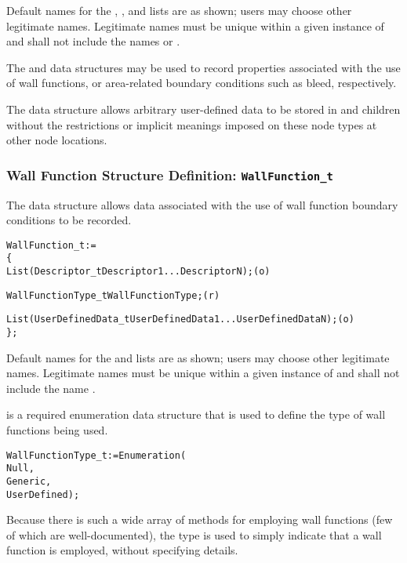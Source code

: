 \begin{notes}
\item
 Default names for the , , and
 lists are as shown; users may choose other legitimate names.
 Legitimate names must be unique within a given instance of
  and shall not include the names  or
 .
\end{notes}

The  and  data structures may be
used to record properties associated with the use of wall functions, or
area-related boundary conditions such as bleed, respectively.

The  data structure allows arbitrary
user-defined data to be stored in  and
 children without the restrictions or implicit
meanings imposed on these node types at other node locations.

\subsubsection{Wall Function Structure Definition: \texttt{WallFunction\_t}}
\label{s:WallFunction}

The  data structure allows data associated with
the use of wall function boundary conditions to be recorded.

\begin{alltt}
  WallFunction\_t :=
    \{
    List( Descriptor\_t  Descriptor1 ... DescriptorN ) ;                     (o)

    WallFunctionType\_t WallFunctionType ;                                   (r)

    List( UserDefinedData\_t UserDefinedData1 ... UserDefinedDataN ) ;       (o)
    \} ;
\end{alltt}

\begin{notes}
\item
 Default names for the  and 
 lists are as shown; users may choose other legitimate names.
 Legitimate names must be unique within a given instance of
  and shall not include the name
 .
\end{notes}

 is a required enumeration data structure
that is used to define the type of wall functions being used.
\begin{alltt}
  WallFunctionType\_t := Enumeration(
    Null,
    Generic,
    UserDefined ) ;
\end{alltt}
Because there is such a wide array of methods for employing wall
functions (few of which are well-documented), the type 
is used to simply indicate that a wall function is employed, without
specifying details.

